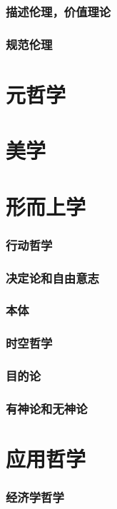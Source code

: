 \documentclass[UTF8]{../RepresentationUniverse}
\begin{document}
    \subsection{描述伦理，价值理论}
    \subsection{规范伦理}
    

\chapter{元哲学}
\chapter{美学}


\chapter{形而上学}
    \subsection{行动哲学}
    \subsection{决定论和自由意志}
    \subsection{本体}
    \subsection{时空哲学}
    \subsection{目的论}
    \subsection{有神论和无神论}






\chapter{应用哲学}
    \subsection{经济学哲学}
\end{document}
